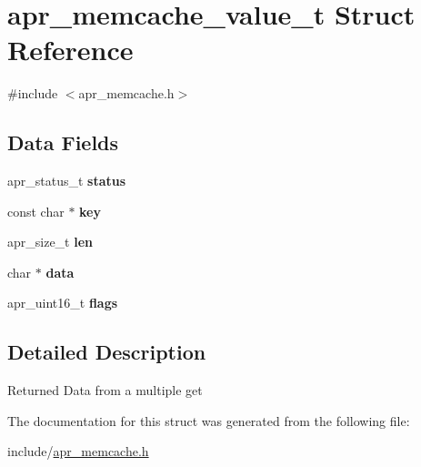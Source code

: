 \hypertarget{structapr__memcache__value__t}{\section{apr\-\_\-memcache\-\_\-value\-\_\-t Struct Reference}
\label{structapr__memcache__value__t}
}


{\ttfamily \#include $<$apr\-\_\-memcache.\-h$>$}

\subsection*{Data Fields}
\begin{DoxyCompactItemize}
\item 
\hypertarget{structapr__memcache__value__t_a02cb1c2f8e2ac25cd1ecfcb897f13b19}{apr\-\_\-status\-\_\-t {\bfseries status}}\label{structapr__memcache__value__t_a02cb1c2f8e2ac25cd1ecfcb897f13b19}

\item 
\hypertarget{structapr__memcache__value__t_a0f824723507e179cfa18a169d6efe4e4}{const char $\ast$ {\bfseries key}}\label{structapr__memcache__value__t_a0f824723507e179cfa18a169d6efe4e4}

\item 
\hypertarget{structapr__memcache__value__t_a64229f861b27fc4a9bdfab7b44c971a1}{apr\-\_\-size\-\_\-t {\bfseries len}}\label{structapr__memcache__value__t_a64229f861b27fc4a9bdfab7b44c971a1}

\item 
\hypertarget{structapr__memcache__value__t_aaa222208c2c3f010f90043802afe235d}{char $\ast$ {\bfseries data}}\label{structapr__memcache__value__t_aaa222208c2c3f010f90043802afe235d}

\item 
\hypertarget{structapr__memcache__value__t_a3314f50ec7a91e19abc44f15fdf2366f}{apr\-\_\-uint16\-\_\-t {\bfseries flags}}\label{structapr__memcache__value__t_a3314f50ec7a91e19abc44f15fdf2366f}

\end{DoxyCompactItemize}


\subsection{Detailed Description}
Returned Data from a multiple get 

The documentation for this struct was generated from the following file\-:\begin{DoxyCompactItemize}
\item 
include/\hyperlink{apr__memcache_8h}{apr\-\_\-memcache.\-h}\end{DoxyCompactItemize}
